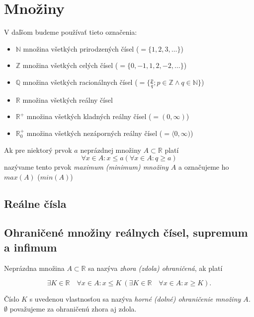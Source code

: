 \chapter{Množiny}

V daľšom budeme používať tieto označenia:
\begin{itemize}[label=]
  \item $\mathbb{N}$ množina všetkých prirodzených čísel ($= \{ 1, 2, 3, \ldots \}$)
  \item $\mathbb{Z}$ množina všetkých celých čísel ($= \{ 0, -1, 1, 2, -2, \ldots \}$)
  \item $\mathbb{Q}$ množina všetkých racionálnych čísel
    ($= \{ \frac{p}{q}; p \in \mathbb{Z} \land q \in \mathbb{N} \}$)
  \item $\mathbb{R}$ množina všetkých reálny čísel
  \item $\mathbb{R}^+$ množina všetkých kladných reálny čísel ($= ( 0, \infty )$)
  \item $\mathbb{R}^+_0$ množina všetkých nezáporných reálny čísel
    ($= \langle 0, \infty )$)
\end{itemize}
Ak pre niektorý prvok $a$ neprázdnej množiny $A \subset \mathbb{R}$ platí
$$\forall x \in A : x \leq a (\forall x \in A: q \geq a)$$
nazývame tento prvok \emph{maximum (minimum) množiny $A$} a označujeme ho
$max(A)$ ($min(A)$)

\section{Reálne čísla}

\begin{enumerate}[resume]
\end{enumerate}

\section{Ohraničené množiny reálnych čísel, supremum a infimum}

Neprázdna množina $A \subset \mathbb{R}$ sa nazýva \textit{zhora (zdola)
ohraničená}, ak platí

$$
\exists K \in  \mathbb{R} \quad \forall x \in A: x \leq K \:
(\exists K \in \mathbb{R} \quad \forall x \in A: x \geq K).
$$

Číslo $K$ s uvedenou vlastnosťou sa nazýva \textit{horné (dolné)
ohraničenie množiny $A$.} $\emptyset$ považujeme za ohraničenú zhora aj zdola.

